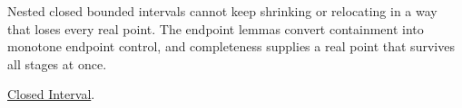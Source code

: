 \begin{remark*}[Interpretation]
Nested closed bounded intervals cannot keep shrinking or relocating in a way
that loses every real point. The endpoint lemmas convert containment into
monotone endpoint control, and completeness supplies a real point that survives
all stages at once.
\end{remark*}

\begin{dependencies}
\hyperref[def:closed-interval]{Closed Interval}.
\end{dependencies}


